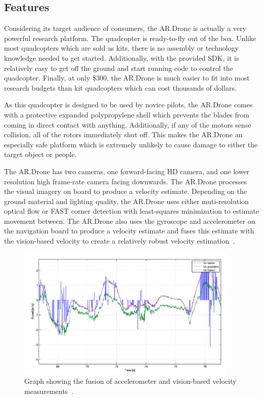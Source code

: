     \subsection{Features}
        Considering its target audience of consumers, the AR.Drone is actually a very powerful research platform. The quadcopter is ready-to-fly out of the box. Unlike most quadcopters which are sold as kits, there is no assembly or technology knowledge needed to get started. Additionally, with the provided SDK, it is relatively easy to get off the ground and start running code to control the quadcopter. Finally, at only \$300, the AR.Drone is much easier to fit into most research budgets than kit quadcopters which can cost thousands of dollars. 

        As this quadcopter is designed to be used by novice pilots, the AR.Drone comes with a protective expanded polypropylene shell which prevents the blades from coming in direct contact with anything. Additionally, if any of the motors sense collision, all of the rotors immediately shut off. This makes the AR.Drone an especially safe platform which is extremely unlikely to cause damage to either the target object or people.

        The AR.Drone has two cameras, one forward-facing HD camera, and one lower resolution high frame-rate camera facing downwards. The AR.Drone processes the visual imagery on board to produce a velocity estimate. Depending on the ground material and lighting quality, the AR.Drone uses either muti-resolution optical flow or FAST corner detection with least-squares minimization to estimate movement between. The AR.Drone also uses the gyroscope and accelerometer on the navigation board to produce a velocity estimate and fuses this estimate with the vision-based velocity to create a relatively robust velocity estimation~\cite{Bristeau}.

        \begin{figure}[ht]
            \centering
            \includegraphics[width=400px]{../images/fused.png}
            \caption{Graph showing the fusion of accelerometer and vision-based velocity measurements~\cite{Bristeau}.}\label{fig:fusion}
        \end{figure}

